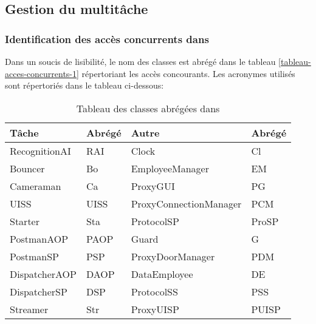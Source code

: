 \newpage
\subsection{Gestion du multitâche}
\subsubsection{Identification des accès concurrents dans \appliLin}%

Dans un soucis de lisibilité, le nom des classes est abrégé dans le tableau \ref{tableau-acces-concurrents-1} répertoriant les accès concourants.
Les acronymes utilisés sont répertoriés dans le tableau ci-dessous:

\begin{table}[H]
    \centering
    \begin{tabularx}{\textwidth}{|X|p{2cm}|X|p{2cm}|}
      \hline 
         \textbf{Tâche}  &  \textbf{Abrégé} & \textbf{Autre} & \textbf{Abrégé} \\ 
        \hline
        RecognitionAI  & RAI & Clock &  Cl \\ 
        \hline
        Bouncer  & Bo & EmployeeManager &  EM \\ 
        \hline
        Cameraman  & Ca & ProxyGUI &  PG \\ 
        \hline
        UISS  &  UISS & ProxyConnectionManager &  PCM \\ 
        \hline
        Starter  & Sta & ProtocolSP &  ProSP \\ 
        \hline
        PostmanAOP  & PAOP & Guard &  G \\ 
        \hline
        PostmanSP  & PSP & ProxyDoorManager &  PDM \\ 
        \hline
        DispatcherAOP  & DAOP & DataEmployee &  DE \\ 
        \hline
        DispatcherSP  & DSP & ProtocolSS &  PSS \\ 
        \hline
        Streamer & Str & ProxyUISP &  PUISP \\ 
        \hline

    \end{tabularx}
    \caption{Tableau des classes abrégées  dans \appliLin}
    \label{tableau-abreger-classe-1}
  \end{table}

